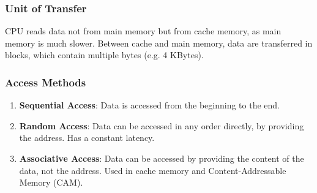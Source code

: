 \subsubsection{Unit of Transfer}

CPU reads data not from main memory but from cache memory, as main memory is
much slower. Between cache and main memory, data are transferred in blocks, which
contain multiple bytes (e.g. 4 KBytes).

\subsubsection{Access Methods}

\begin{enumerate}
    \item \textbf{Sequential Access}: Data is accessed from the beginning to the end.
    \item \textbf{Random Access}: Data can be accessed in any order directly, by
        providing the address. Has a constant latency.
    \item \textbf{Associative Access}: Data can be accessed by providing the content
        of the data, not the address. Used in cache memory and Content-Addressable
        Memory (CAM).
\end{enumerate}